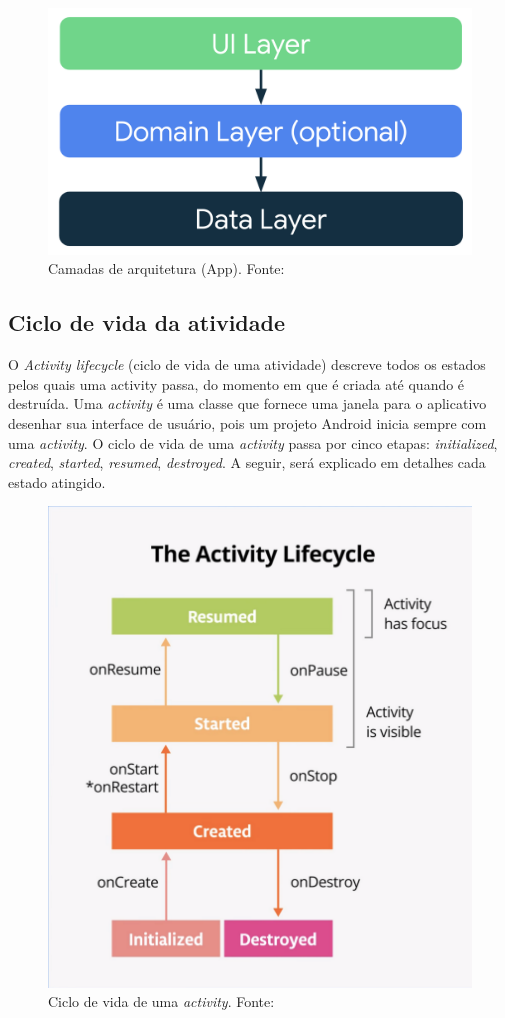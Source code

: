 \begin{figure}[ht]
    \centering
    \includegraphics[width=.63\textwidth]{img/app-android-layers.png}
    \caption{Camadas de arquitetura (App). Fonte:\cite{google-developers-guideline}}\label{figAppLayer}
\end{figure}

\subsection{Ciclo de vida da atividade}\label{ciclo-de-vida}

O \textit{Activity lifecycle} (ciclo de vida de uma atividade) descreve todos os estados pelos quais uma activity passa, do momento em que é criada
até quando é destruída. Uma \textit{activity} é uma classe que fornece uma janela para o aplicativo desenhar sua interface de usuário, pois um projeto Android 
inicia sempre com uma \textit{activity}. O ciclo de vida de uma \textit{activity} passa por cinco etapas: 
\textit{initialized}, \textit{created}, \textit{started}, \textit{resumed}, \textit{destroyed}. A seguir, será explicado em detalhes
cada estado atingido.

\begin{figure}[ht]
    \centering
    \includegraphics[width=.44\textwidth]{img/activity-lifecycle.png}
    \caption{Ciclo de vida de uma \textit{activity}. Fonte:\cite{google-developers-activity-lifecycle}}\label{figActivityLifeCycle}
\end{figure}

